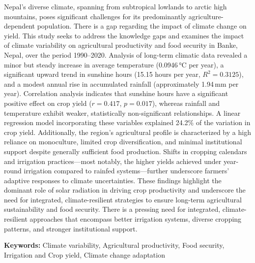 Nepal's diverse climate, spanning from subtropical lowlands to arctic high mountains, poses significant challenges for its predominantly agriculture-dependent population. There is a gap regarding the impact of climate change on yield. This study seeks to address the knowledge gaps and examines the impact of climate variability on agricultural productivity and food security in Banke, Nepal, over the period 1990--2020. Analysis of long-term climatic data revealed a minor but steady increase in average temperature (0.0946\,°C per year), a significant upward trend in sunshine hours (15.15 hours per year, $R^2 = 0.3125$), and a modest annual rise in accumulated rainfall (approximately 1.94\,mm per year). Correlation analysis indicates that sunshine hours have a significant positive effect on crop yield ($r = 0.417$, $p = 0.017$), whereas rainfall and temperature exhibit weaker, statistically non-significant relationships. A linear regression model incorporating these variables explained 24.2\% of the variation in crop yield. Additionally, the region's agricultural profile is characterized by a high reliance on monoculture, limited crop diversification, and minimal institutional support despite generally sufficient food production. Shifts in cropping calendars and irrigation practices—most notably, the higher yields achieved under year-round irrigation compared to rainfed systems—further underscore farmers' adaptive responses to climate uncertainties. These findings highlight the dominant role of solar radiation in driving crop productivity and underscore the need for integrated, climate-resilient strategies to ensure long-term agricultural sustainability and food security. There is a pressing need for integrated, climate-resilient approaches that encompass better irrigation systems, diverse cropping patterns, and stronger institutional support.


\textbf{Keywords:} Climate variability, Agricultural productivity, Food security, Irrigation and Crop yield, Climate change adaptation


